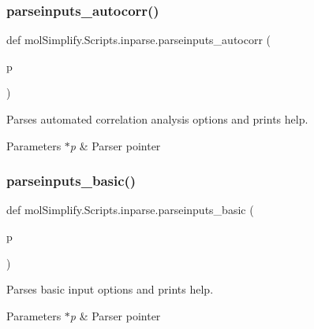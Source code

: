 \subsubsection{\texorpdfstring{parseinputs\+\_\+autocorr()}{parseinputs\_autocorr()}}
{\footnotesize\ttfamily def mol\+Simplify.\+Scripts.\+inparse.\+parseinputs\+\_\+autocorr (\begin{DoxyParamCaption}\item[{}]{p }\end{DoxyParamCaption})}



Parses automated correlation analysis options and prints help. 


\begin{DoxyParams}{Parameters}
{\em $\ast$p} & Parser pointer \\
\hline
\end{DoxyParams}
\mbox{\label{namespacemolSimplify_1_1Scripts_1_1inparse_ac0d05f3a75be1c12787ac51b64d9e36b}} 
\subsubsection{\texorpdfstring{parseinputs\+\_\+basic()}{parseinputs\_basic()}}
{\footnotesize\ttfamily def mol\+Simplify.\+Scripts.\+inparse.\+parseinputs\+\_\+basic (\begin{DoxyParamCaption}\item[{}]{p }\end{DoxyParamCaption})}



Parses basic input options and prints help. 


\begin{DoxyParams}{Parameters}
{\em $\ast$p} & Parser pointer \\
\hline
\end{DoxyParams}
\mbox{\label{namespacemolSimplify_1_1Scripts_1_1inparse_a6e30097829594a867c72ce7647edc5dc}} 
